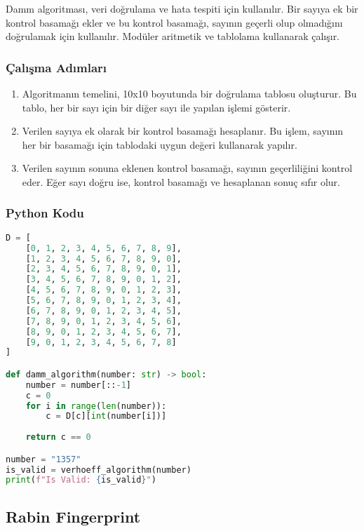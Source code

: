 Damm algoritması, veri doğrulama ve hata tespiti için kullanılır. Bir sayıya ek bir kontrol basamağı ekler ve bu kontrol basamağı, sayının geçerli olup olmadığını doğrulamak için kullanılır. Modüler aritmetik ve tablolama kullanarak çalışır.

\subsubsection{Çalışma Adımları}

\begin{enumerate}
    \item Algoritmanın temelini, 10x10 boyutunda bir doğrulama tablosu oluşturur. Bu tablo, her bir sayı için bir diğer sayı ile yapılan işlemi gösterir.
    \item Verilen sayıya ek olarak bir kontrol basamağı hesaplanır. Bu işlem, sayının her bir basamağı için tablodaki uygun değeri kullanarak yapılır.
    \item Verilen sayının sonuna eklenen kontrol basamağı, sayının geçerliliğini kontrol eder. Eğer sayı doğru ise, kontrol basamağı ve hesaplanan sonuç sıfır olur.
\end{enumerate}

\subsubsection{Python Kodu}

\begin{lstlisting}[language=Python]
D = [
    [0, 1, 2, 3, 4, 5, 6, 7, 8, 9],
    [1, 2, 3, 4, 5, 6, 7, 8, 9, 0],
    [2, 3, 4, 5, 6, 7, 8, 9, 0, 1],
    [3, 4, 5, 6, 7, 8, 9, 0, 1, 2],
    [4, 5, 6, 7, 8, 9, 0, 1, 2, 3],
    [5, 6, 7, 8, 9, 0, 1, 2, 3, 4],
    [6, 7, 8, 9, 0, 1, 2, 3, 4, 5],
    [7, 8, 9, 0, 1, 2, 3, 4, 5, 6],
    [8, 9, 0, 1, 2, 3, 4, 5, 6, 7],
    [9, 0, 1, 2, 3, 4, 5, 6, 7, 8]
]

def damm_algorithm(number: str) -> bool:
    number = number[::-1]
    c = 0
    for i in range(len(number)):
        c = D[c][int(number[i])]
    
    return c == 0

number = "1357"
is_valid = verhoeff_algorithm(number)
print(f"Is Valid: {is_valid}")
\end{lstlisting}

\newpage

\subsection{Rabin Fingerprint}

